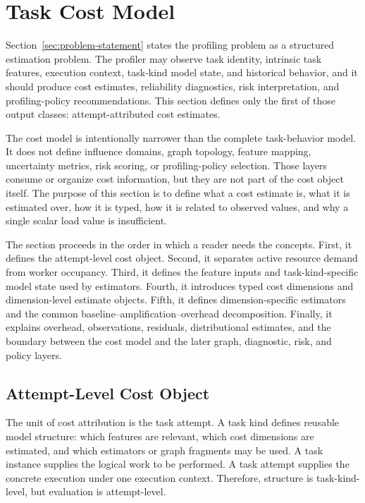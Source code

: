 \section{Task Cost Model}
\label{sec:task-cost-model}

Section~\ref{sec:problem-statement} states the profiling problem as a structured
estimation problem. The profiler may observe task identity, intrinsic task
features, execution context, task-kind model state, and historical behavior, and
it should produce cost estimates, reliability diagnostics, risk interpretation,
and profiling-policy recommendations. This section defines only the first of
those output classes: attempt-attributed cost estimates.

The cost model is intentionally narrower than the complete task-behavior model.
It does not define influence domains, graph topology, feature mapping,
uncertainty metrics, risk scoring, or profiling-policy selection. Those layers
consume or organize cost information, but they are not part of the cost object
itself. The purpose of this section is to define what a cost estimate is, what it
is estimated over, how it is typed, how it is related to observed values, and why
a single scalar load value is insufficient.

The section proceeds in the order in which a reader needs the concepts. First,
it defines the attempt-level cost object. Second, it separates active resource
demand from worker occupancy. Third, it defines the feature inputs and
task-kind-specific model state used by estimators. Fourth, it introduces typed
cost dimensions and dimension-level estimate objects. Fifth, it defines
dimension-specific estimators and the common baseline--amplification--overhead
decomposition. Finally, it explains overhead, observations, residuals,
distributional estimates, and the boundary between the cost model and the later
graph, diagnostic, risk, and policy layers.

\subsection{Attempt-Level Cost Object}
\label{sec:cost-attempt-level}

The unit of cost attribution is the task attempt. A task kind defines reusable
model structure: which features are relevant, which cost dimensions are
estimated, and which estimators or graph fragments may be used. A task instance
supplies the logical work to be performed. A task attempt supplies the concrete
execution under one execution context. Therefore, structure is task-kind-level,
but evaluation is attempt-level.

